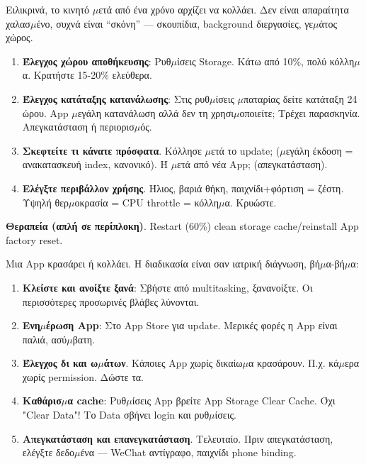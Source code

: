 


Ειλικρινά, το κινητό $\mu$ετά από ένα χρόνο αρχίζει να κολλάει. Δεν είναι απαραίτητα χαλασ$\mu$ένο, συχνά είναι “σκόνη” — σκουπίδια, background διεργασίες, γε$\mu$άτος χώρος.


\begin{enumerate}
  \item \textbf{Έλεγχος χώρου αποθήκευσης}: Ρυθ$\mu$ίσεις Storage. Κάτω από 10\%, πολύ κόλλη$\mu$α. Κρατήστε 15-20\% ελεύθερα.
  \item \textbf{Έλεγχος κατάταξης κατανάλωσης}: Στις ρυθ$\mu$ίσεις $\mu$παταρίας δείτε κατάταξη 24 ώρου. App $\mu$εγάλη κατανάλωση αλλά δεν τη χρησι$\mu$οποιείτε; Τρέχει παρασκηνία. Απεγκατάσταση ή περιορισ$\mu$ός.
  \item \textbf{Σκεφτείτε τι κάνατε πρόσφατα}. Κόλλησε $\mu$ετά το update; ($\mu$εγάλη έκδοση = ανακατασκευή index, κανονικό). Ή $\mu$ετά από νέα App; (απεγκατάσταση).
  \item \textbf{Ελέγξτε περιβάλλον χρήσης}. Ήλιος, βαριά θήκη, παιχνίδι+φόρτιση = ζέστη. Υψηλή θερ$\mu$οκρασία = CPU throttle = κόλλη$\mu$α. Κρυώστε.
\end{enumerate}

\textbf{Θεραπεία (απλή σε περίπλοκη)}. Restart (60\%) clean storage cache/reinstall App factory reset.


Μια App κρασάρει ή κολλάει. Η διαδικασία είναι σαν ιατρική διάγνωση, βή$\mu$α-βή$\mu$α:

\begin{enumerate}
  \item \textbf{Κλείστε και ανοίξτε ξανά}: Σβήστε από multitasking, ξανανοίξτε. Οι περισσότερες προσωρινές βλάβες λύνονται.
  \item \textbf{Ενη$\mu$έρωση App}: Στο App Store για update. Μερικές φορές η App είναι παλιά, ασύ$\mu$βατη.
  \item \textbf{Έλεγχος δι και ω$\mu$άτων}. Κάποιες App χωρίς δικαίω$\mu$α κρασάρουν. Π.χ. κά$\mu$ερα χωρίς permission. Δώστε τα.
  \item \textbf{Καθάρισ$\mu$α cache}: Ρυθ$\mu$ίσεις App βρείτε App Storage Clear Cache. Όχι "Clear Data"! Το Data σβήνει login και ρυθ$\mu$ίσεις.
  \item \textbf{Απεγκατάσταση και επανεγκατάσταση}. Τελευταίο. Πριν απεγκατάσταση, ελέγξτε δεδο$\mu$ένα — WeChat αντίγραφο, παιχνίδι phone binding.
\end{enumerate}

